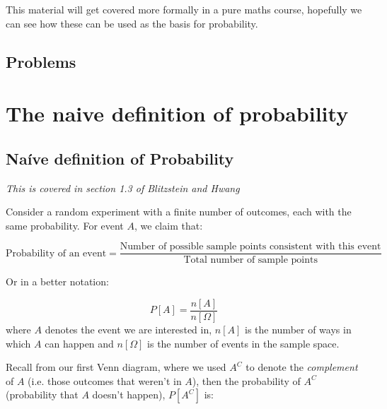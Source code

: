 \documentclass[12pt]{extbook}
\begin{document}
This material will get covered more formally in a pure maths course, hopefully we can see how these can be used as the basis for probability.



\section{Problems}
\begin{enumerate}


%
%

\end{enumerate}



\chapter{The naive definition of probability}

\section{Na\'ive definition of Probability}

\textit{This is covered in section 1.3 of Blitzstein and Hwang}

Consider a random experiment with a finite number of outcomes, each with the same probability.   For event $A$, we claim that:

\begin{displaymath}
\mbox{Probability of an event} = \frac{\mbox{Number of possible sample points consistent with this event}}{\mbox{Total number of sample points}}
\end{displaymath}

Or in a better notation:

\begin{equation}
P[A] = \frac{n[A]}{n[\Omega]}
\end{equation}
where $A$ denotes the event we are interested in, $n[A]$ is the number of ways in which $A$ can happen and $n[\Omega]$ is the number of events in the sample space.  


Recall from our first Venn diagram, where we used $A^C$ to denote the \emph{complement} of $A$ (i.e. those outcomes that weren't in $A$), then the probability of $A^C$ (probability that $A$ doesn't happen), $P[A^C]$ is:
\end{document}
